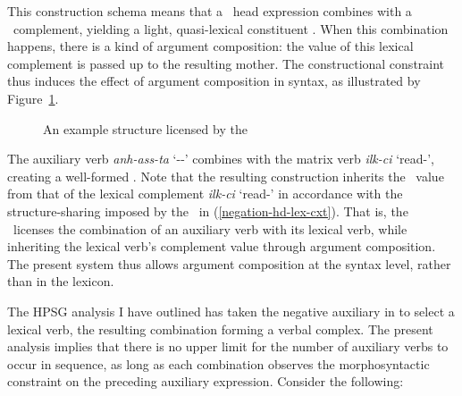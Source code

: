 \documentclass[output=paper
 	        ,biblatex
                ,babelshorthands
                ,newtxmath
                ,draftmode
                ,colorlinks, citecolor=brown
]{langscibook}
\begin{document}
\begin{exe}
\begin{xlist}
\begin{exe}
\begin{xlist}
\noindent
This construction schema means that a \LIGHT\ head expression combines with a \LIGHT\ complement,
yielding a light, quasi-lexical constituent \citep{BW:13}.  When this combination happens, there is
a kind of argument composition: the \comps value of this lexical complement is passed up to the
resulting mother.  The constructional constraint thus induces the effect of argument composition in
syntax, as illustrated by Figure~\ref{kor-v-complex}.
\begin{figure}
\caption{An example structure licensed by the \hdlight}\label{kor-v-complex}
\end{figure}
The auxiliary verb \textit{anh-ass-ta} `\NEG-\PST-\DECL' combines with the matrix verb \textit{ilk-ci} `read-\conn',
creating a well-formed .
Note that the resulting construction inherits the
\COMPS\ value from that of the lexical complement \textit{ilk-ci} `read-\conn' in accordance with the structure-sharing
imposed by the \hdlight\
in (\ref{negation-hd-lex-cxt}). That is, the \hdlight\ licenses
the combination of an auxiliary verb with its lexical verb, while
inheriting the lexical verb's complement value through argument composition.
The present system thus allows argument composition at the syntax level, rather than in the lexicon.

The HPSG analysis I have outlined has taken the negative auxiliary in 
to select a lexical verb, the resulting combination forming a verbal complex. The present analysis
implies that there is no upper limit for the number of auxiliary verbs to occur in sequence, as long
as each combination observes the morphosyntactic constraint on the preceding auxiliary expression. Consider
the following:


\end{xlist}
\end{exe}
\end{xlist}
\end{exe}
\end{document}
